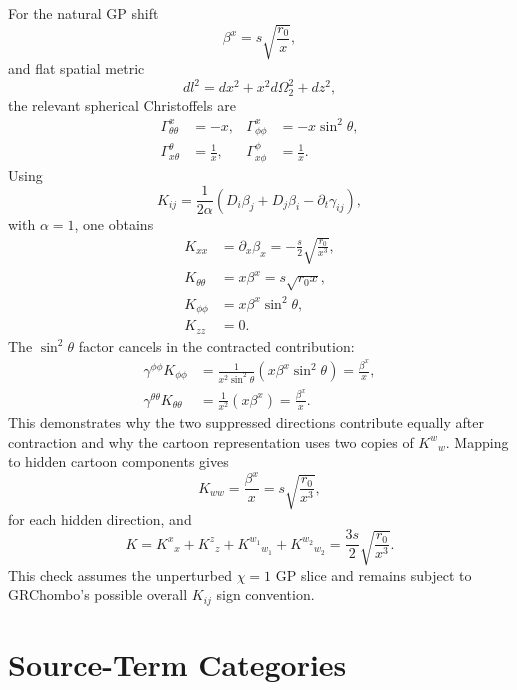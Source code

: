 \documentclass[11pt]{article}
\begin{document}
For the natural GP shift
\begin{equation}
  \beta^x = s\sqrt{\frac{r_0}{x}},
\end{equation}
and flat spatial metric
\begin{equation}
  dl^2 = dx^2 + x^2 d\Omega_2^2 + dz^2,
\end{equation}
the relevant spherical Christoffels are
\begin{align}
  \Gamma^x_{\theta\theta} &= -x, &
  \Gamma^x_{\phi\phi} &= -x\sin^2\theta,\\
  \Gamma^\theta_{x\theta} &= \frac{1}{x}, &
  \Gamma^\phi_{x\phi} &= \frac{1}{x}.
\end{align}
Using
\begin{equation}
  K_{ij}
  =
  \frac{1}{2\alpha}
  \left(D_i\beta_j+D_j\beta_i-\partial_t\gamma_{ij}\right),
\end{equation}
with \(\alpha=1\), one obtains
\begin{align}
  K_{xx} &= \partial_x\beta_x
  = -\frac{s}{2}\sqrt{\frac{r_0}{x^3}},\\
  K_{\theta\theta} &= x\beta^x = s\sqrt{r_0x},\\
  K_{\phi\phi} &= x\beta^x\sin^2\theta,\\
  K_{zz} &= 0.
\end{align}
The \(\sin^2\theta\) factor cancels in the contracted contribution:
\begin{align}
  \gamma^{\phi\phi}K_{\phi\phi}
  &=
  \frac{1}{x^2\sin^2\theta}
  \left(x\beta^x\sin^2\theta\right)
  =
  \frac{\beta^x}{x},\\
  \gamma^{\theta\theta}K_{\theta\theta}
  &=
  \frac{1}{x^2}\left(x\beta^x\right)
  =
  \frac{\beta^x}{x}.
\end{align}
This demonstrates why the two suppressed directions contribute equally after
contraction and why the cartoon representation uses two copies of
\(K^w{}_w\).
Mapping to hidden cartoon components gives
\begin{equation}
  K_{ww} = \frac{\beta^x}{x} = s\sqrt{\frac{r_0}{x^3}},
\end{equation}
for each hidden direction, and
\begin{equation}
  K
  =
  K^x{}_x+K^z{}_z+K^{w_1}{}_{w_1}+K^{w_2}{}_{w_2}
  =
  \frac{3s}{2}\sqrt{\frac{r_0}{x^3}}.
\end{equation}
This check assumes the unperturbed \(\chi=1\) GP slice and remains subject to
GRChombo's possible overall \(K_{ij}\) sign convention.

\section{Source-Term Categories}
\end{document}
